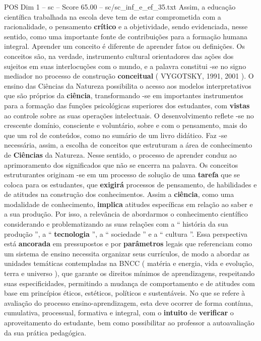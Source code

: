 \begin{textsample}{POS Dim 1 – sc – Score 65.00 – sc/sc\_inf\_e\_ef\_35.txt}
Assim, a educação científica trabalhada na escola deve tem de estar comprometida com a racionalidade, o pensamento \textbf{crítico} e a objetividade, sendo evidenciada, nesse sentido, como uma importante fonte de contribuições para a formação humana integral.
Aprender um conceito é diferente de aprender fatos ou definições.
Os conceitos são, na verdade, instrumento cultural orientadores das ações dos sujeitos em suas interlocuções com o mundo, e a palavra constitui -se no signo mediador no processo de construção \textbf{conceitual} ( VYGOTSKY, 1991, 2001 ).
O ensino das Ciências da Natureza possibilita o acesso aos modelos interpretativos que são próprios da \textbf{ciência}, transformando -se em importantes instrumentos para a formação das funções psicológicas superiores dos estudantes, com \textbf{vistas} ao controle sobre as suas operações intelectuais.
O desenvolvimento reflete -se no crescente domínio, consciente e voluntário, sobre e com o pensamento, mais do que um rol de conteúdos, como no sumário de um livro didático.
Faz -se necessária, assim, a escolha de conceitos que estruturam a área de conhecimento de \textbf{Ciências} da Natureza.
Nesse sentido, o processo de aprender conduz ao aprimoramento dos significados que não se encerra na palavra.
Os conceitos estruturantes originam -se em um processo de solução de uma \textbf{tarefa} que se coloca para os estudantes, que \textbf{exigirá} processos de pensamento, de habilidades e de atitudes na construção dos conhecimentos.
Assim a \textbf{ciência}, como uma modalidade de conhecimento, \textbf{implica} atitudes específicas em relação ao saber e a sua produção.
Por isso, a relevância de abordarmos o conhecimento científico considerando e problematizando as suas relações com a “ história da sua produção ”, a “ \textbf{tecnologia} ”, a “ sociedade ” e a “ cultura ”.
Essa perspectiva está \textbf{ancorada} em pressupostos e por \textbf{parâmetros} legais que referenciam como um sistema de ensino necessita organizar seus currículos, de modo a abordar as unidades temáticas contempladas na BNCC ( matéria e energia, vida e evolução, terra e universo ), que garante os direitos mínimos de aprendizagens, respeitando suas especificidades, permitindo a mudança de comportamento e de atitudes com base em princípios éticos, estéticos, políticos e sustentáveis.
No que se refere à avaliação do processo ensino-aprendizagem, esta deve ocorrer de forma contínua, cumulativa, processual, formativa e integral, com o \textbf{intuito} de \textbf{verificar} o aproveitamento do estudante, bem como possibilitar ao professor a autoavaliação da sua prática pedagógica.

\end{textsample}
